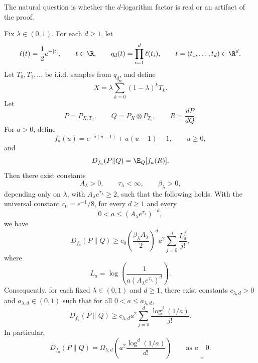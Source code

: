 The natural question is whether the $d$-logarithm factor is real or an artifact of the proof.
\begin{theorem}
    \label{thm:product_laplace_gamma_lower}
    Fix $\lambda\in(0,1)$. For each $d\ge1$, let
    \[
        \ell(t)=\frac12 e^{-|t|},\qquad t\in\R,
        \qquad
        q_d(t)=\prod_{i=1}^d \ell(t_i),
        \qquad t=(t_1,\ldots,t_d)\in\R^d .
    \]
    Let $T_0,T_1,\ldots$ be i.i.d. samples from $q_d$, and define
    \[
        X=\lambda\sum_{k=0}^{\infty}(1-\lambda)^kT_k .
    \]
    Let
    \[
        P=P_{X,T_0},
        \qquad
        Q=P_X\otimes P_{T_0},
        \qquad
        R=\frac{dP}{dQ}.
    \]
    For $a>0$, define
    \[
        f_a(u)=e^{-a(u-1)}+a(u-1)-1,\qquad u\ge0,
    \]
    and
    \[
        D_{f_a}(P\|Q)=\E_Q[f_a(R)].
    \]
    Then there exist constants
    \[
        A_\lambda>0,\qquad
        \tau_\lambda<\infty,\qquad
        \beta_\lambda>0,
    \]
    depending only on $\lambda$, with $A_\lambda e^{\tau_\lambda}\ge2$, such that the following holds.
    With the universal constant $c_0=e^{-1}/8$, for every $d\ge1$ and every
    \[
        0<a\le (A_\lambda e^{\tau_\lambda})^{-d},
    \]
    we have
    \[
        D_{f_a}(P\|Q)
        \ge
        c_0
        \left(\frac{\beta_\lambda A_\lambda}{2}\right)^d
        a^2
        \sum_{j=0}^d
        \frac{L_a^j}{j!},
    \]
    where
    \[
        L_a
        =
        \log\left(
        \frac{1}{a(A_\lambda e^{\tau_\lambda})^d}
        \right).
    \]
    Consequently, for each fixed $\lambda\in(0,1)$ and $d\ge1$, there exist constants
    $c_{\lambda,d}>0$ and $a_{\lambda,d}\in(0,1)$ such that for all
    $0<a\le a_{\lambda,d}$,
    \[
        D_{f_a}(P\|Q)
        \ge
        c_{\lambda,d}
        a^2
        \sum_{j=0}^d
        \frac{\log^j(1/a)}{j!}.
    \]
    In particular,
    \[
        D_{f_a}(P\|Q)
        =
        \Omega_{\lambda,d}
        \left(
        a^2\frac{\log^d(1/a)}{d!}
        \right)
        \qquad\text{as }a\downarrow0.
    \]
\end{theorem}


